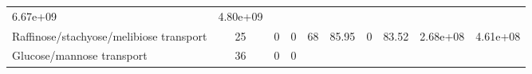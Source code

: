 \documentclass[]{article}
\begin{document}
\begin{longtable}[]{@{}lccccccccc@{}}
\begin{minipage}[t]{0.08\columnwidth}
6.67e+09\strut
\end{minipage} & \begin{minipage}[t]{0.08\columnwidth}\centering\strut
4.80e+09\strut
\end{minipage}\tabularnewline
\begin{minipage}[t]{0.07\columnwidth}\raggedright\strut
Raffinose/stachyose/melibiose transport\strut
\end{minipage} & \begin{minipage}[t]{0.06\columnwidth}\centering\strut
25\strut
\end{minipage} & \begin{minipage}[t]{0.08\columnwidth}\centering\strut
0\strut
\end{minipage} & \begin{minipage}[t]{0.08\columnwidth}\centering\strut
0\strut
\end{minipage} & \begin{minipage}[t]{0.08\columnwidth}\centering\strut
68\strut
\end{minipage} & \begin{minipage}[t]{0.08\columnwidth}\centering\strut
85.95\strut
\end{minipage} & \begin{minipage}[t]{0.08\columnwidth}\centering\strut
0\strut
\end{minipage} & \begin{minipage}[t]{0.08\columnwidth}\centering\strut
83.52\strut
\end{minipage} & \begin{minipage}[t]{0.08\columnwidth}\centering\strut
2.68e+08\strut
\end{minipage} & \begin{minipage}[t]{0.08\columnwidth}\centering\strut
4.61e+08\strut
\end{minipage}\tabularnewline
\begin{minipage}[t]{0.07\columnwidth}\raggedright\strut
Glucose/mannose transport\strut
\end{minipage} & \begin{minipage}[t]{0.06\columnwidth}\centering\strut
36\strut
\end{minipage} & \begin{minipage}[t]{0.08\columnwidth}\centering\strut
0\strut
\end{minipage} & \begin{minipage}[t]{0.08\columnwidth}\centering\strut
0\strut
\end{minipage} & \begin{minipage}[t]{0.08\columnwidth}\centering\strut

\end{minipage}
\end{longtable}
\end{document}
